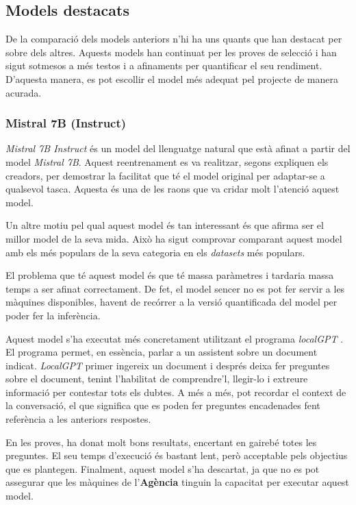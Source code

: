 \subsection{Models destacats}
De la comparació dels models anteriors n'hi ha uns quants que han destacat per sobre dels altres. Aquests models han continuat per les proves de selecció i han sigut sotmesos a més testos i a afinaments per quantificar el seu rendiment. D'aquesta manera, es pot escollir el model més adequat pel projecte de manera acurada.

\subsubsection{Mistral 7B (Instruct)}
\textit{Mistral 7B Instruct} \cite{mistral} és un model del llenguatge natural que està afinat a partir del model \textit{Mistral 7B}. Aquest reentrenament es va realitzar, segons expliquen els creadors, per demostrar la facilitat que té el model original per adaptar-se a qualsevol tasca. Aquesta és una de les raons que va cridar molt l'atenció aquest model.

Un altre motiu pel qual aquest model és tan interessant és que afirma ser el millor model de la seva mida. Això ha sigut comprovar comparant aquest model amb els més populars de la seva categoria en els \textit{datasets} més populars.

El problema que té aquest model és que té massa paràmetres i tardaria massa temps a ser afinat correctament. De fet, el model sencer no es pot fer servir a les màquines disponibles, havent de recórrer a la versió quantificada del model per poder fer la inferència. 

Aquest model s'ha executat més concretament utilitzant el programa \textit{localGPT} \cite{localgpt}. El programa permet, en essència, parlar a un assistent sobre un document indicat. \textit{LocalGPT} primer ingereix un document i després deixa fer preguntes sobre el document, tenint l'habilitat de comprendre'l, llegir-lo i extreure informació per contestar tots els dubtes. A més a més, pot recordar el context de la conversació, el que significa que es poden fer preguntes encadenades fent referència a les anteriors respostes.

En les proves, ha donat molt bons resultats, encertant en gairebé totes les preguntes. El seu temps d'execució és bastant lent, però acceptable pels objectius que es plantegen. Finalment, aquest model s'ha descartat, ja que no es pot assegurar que les màquines de l'\textbf{Agència} tinguin la capacitat per executar aquest model.


